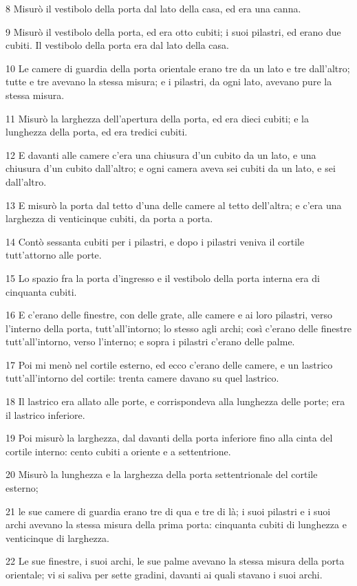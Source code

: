 \par 8 Misurò il vestibolo della porta dal lato della casa, ed era una canna.
\par 9 Misurò il vestibolo della porta, ed era otto cubiti; i suoi pilastri, ed erano due cubiti. Il vestibolo della porta era dal lato della casa.
\par 10 Le camere di guardia della porta orientale erano tre da un lato e tre dall'altro; tutte e tre avevano la stessa misura; e i pilastri, da ogni lato, avevano pure la stessa misura.
\par 11 Misurò la larghezza dell'apertura della porta, ed era dieci cubiti; e la lunghezza della porta, ed era tredici cubiti.
\par 12 E davanti alle camere c'era una chiusura d'un cubito da un lato, e una chiusura d'un cubito dall'altro; e ogni camera aveva sei cubiti da un lato, e sei dall'altro.
\par 13 E misurò la porta dal tetto d'una delle camere al tetto dell'altra; e c'era una larghezza di venticinque cubiti, da porta a porta.
\par 14 Contò sessanta cubiti per i pilastri, e dopo i pilastri veniva il cortile tutt'attorno alle porte.
\par 15 Lo spazio fra la porta d'ingresso e il vestibolo della porta interna era di cinquanta cubiti.
\par 16 E c'erano delle finestre, con delle grate, alle camere e ai loro pilastri, verso l'interno della porta, tutt'all'intorno; lo stesso agli archi; così c'erano delle finestre tutt'all'intorno, verso l'interno; e sopra i pilastri c'erano delle palme.
\par 17 Poi mi menò nel cortile esterno, ed ecco c'erano delle camere, e un lastrico tutt'all'intorno del cortile: trenta camere davano su quel lastrico.
\par 18 Il lastrico era allato alle porte, e corrispondeva alla lunghezza delle porte; era il lastrico inferiore.
\par 19 Poi misurò la larghezza, dal davanti della porta inferiore fino alla cinta del cortile interno: cento cubiti a oriente e a settentrione.
\par 20 Misurò la lunghezza e la larghezza della porta settentrionale del cortile esterno;
\par 21 le sue camere di guardia erano tre di qua e tre di là; i suoi pilastri e i suoi archi avevano la stessa misura della prima porta: cinquanta cubiti di lunghezza e venticinque di larghezza.
\par 22 Le sue finestre, i suoi archi, le sue palme avevano la stessa misura della porta orientale; vi si saliva per sette gradini, davanti ai quali stavano i suoi archi.
